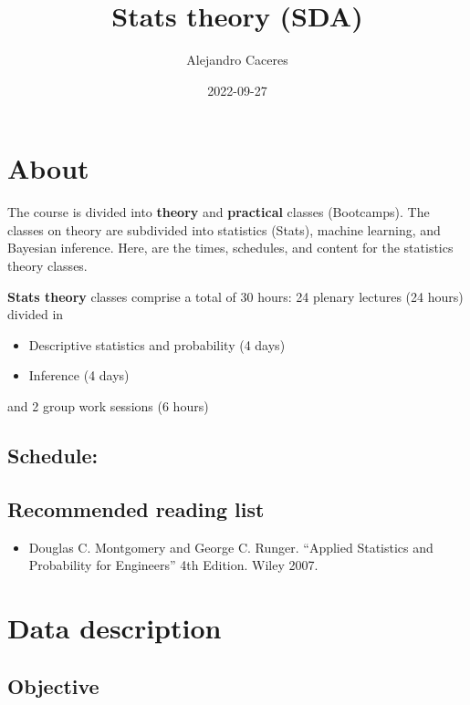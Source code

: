 \documentclass[
]{book}
\title{Stats theory (SDA)}
\author{Alejandro Caceres}
\date{2022-09-27}
\providecommand{\tightlist}{%
  \setlength{\itemsep}{0pt}\setlength{\parskip}{0pt}}
\begin{document}
\maketitle

{
\setcounter{tocdepth}{1}
\tableofcontents
}
\hypertarget{about}{%
\chapter{About}\label{about}}

The course is divided into \textbf{theory} and \textbf{practical} classes (Bootcamps). The classes on theory are subdivided into statistics (Stats), machine learning, and Bayesian inference. Here, are the times, schedules, and content for the statistics theory classes.

\textbf{Stats theory} classes comprise a total of 30 hours: 24 plenary lectures (24 hours) divided in

\begin{itemize}
\tightlist
\item
  Descriptive statistics and probability (4 days)
\item
  Inference (4 days)
\end{itemize}

and 2 group work sessions (6 hours)

\hypertarget{schedule}{%
\section{Schedule:}\label{schedule}}

\hypertarget{recommended-reading-list}{%
\section{Recommended reading list}\label{recommended-reading-list}}

\begin{itemize}
\tightlist
\item
  Douglas C. Montgomery and George C. Runger. ``Applied Statistics and Probability for Engineers'' 4th Edition. Wiley 2007.
\end{itemize}

\hypertarget{data-description}{%
\chapter{Data description}\label{data-description}}

\hypertarget{objective}{%
\section{Objective}\label{objective}}
\end{document}
